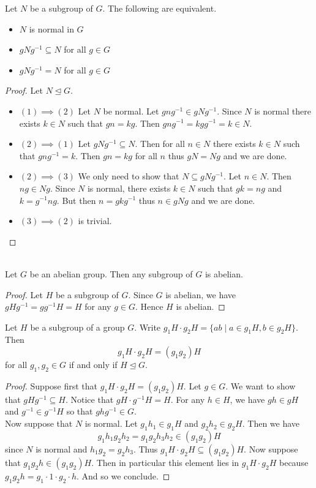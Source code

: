 \documentclass[a4paper]{article}
\begin{document}
\begin{prp}{}{} Let $N$ be a subgroup of $G$. The following are equivalent. 
\begin{itemize}
\item $N$ is normal in $G$
\item $gNg^{-1}\subseteq N$ for all $g\in G$
\item $gNg^{-1}=N$ for all $g\in G$
\end{itemize}
\begin{proof} Let $N\trianglelefteq G$. 
\begin{itemize}
\item $(1)\implies(2)$ Let $N$ be normal. Let $gng^{-1}\in gNg^{-1}$. Since $N$ is normal there exists $k\in N$ such that $gn=kg$. Then $gng^{-1}=kgg^{-1}=k\in N$. 
\item $(2)\implies(1)$ Let $gNg^{-1}\subseteq N$. Then for all $n\in N$ there exists $k\in N$ such that $gng^{-1}=k$. Then $gn=kg$ for all $n$ thus $gN=Ng$ and we are done. 
\item $(2)\implies(3)$ We only need to show that $N\subseteq gNg^{-1}$. Let $n\in N$. Then $ng\in Ng$. Since $N$ is normal, there exists $k\in N$ such that $gk=ng$ and $k=g^{-1}ng$. But then $n=gkg^{-1}$ thus $n\in gNg$ and we are done. 
\item $(3)\implies(2)$ is trivial. 
\end{itemize}
\end{proof}
\end{prp}

\begin{eg}{}{}\\
Let $G$ be an abelian group. Then any subgroup of $G$ is abelian. 
\begin{proof}
Let $H$ be a subgroup of $G$. Since $G$ is abelian, we have $gHg^{-1}=gg^{-1}H=H$ for any $g\in G$. Hence $H$ is abelian. 
\end{proof}
\end{eg}

\begin{prp}{}{} Let $H$ be a subgroup of a group $G$. Write $g_1H\cdot g_2H=\{ab\;|\;a\in g_1H,b\in g_2H\}$. Then $$g_1H\cdot g_2H=(g_1g_2)H$$ for all $g_1,g_2\in G$ if and only if $H\trianglelefteq G$. 
\begin{proof}
Suppose first that $g_1H\cdot g_2H=(g_1g_2)H$. Let $g\in G$. We want to show that $gHg^{-1}\subseteq H$. Notice that $gH\cdot g^{-1}H=H$. For any $h\in H$, we have $gh\in gH$ and $g^{-1}\in g^{-1}H$ so that $ghg^{-1}\in G$. \\

Now suppose that $N$ is normal. Let $g_1h_1\in g_1H$ and $g_2h_2\in g_2H$. Then we have $$g_1h_1g_2h_2=g_1g_2h_3h_2\in(g_1g_2)H$$ since $N$ is normal and $h_1g_2=g_2h_3$. Thus $g_1H\cdot g_2H\subseteq(g_1g_2)H$. Now suppose that $g_1g_2h\in(g_1g_2)H$. Then in particular this element lies in $g_1H\cdot g_2 H$ because $g_1g_2h=g_1\cdot 1\cdot g_2\cdot h$. And so we conclude. 
\end{proof}
\end{prp}
\end{document}
